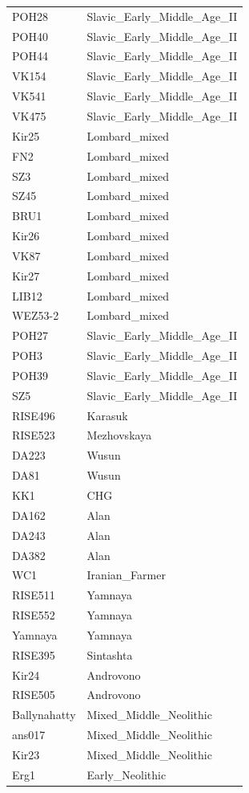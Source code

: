 \begin{longtable}[t]{ll}
POH28 & Slavic\_Early\_Middle\_Age\_II\\
POH40 & Slavic\_Early\_Middle\_Age\_II\\
POH44 & Slavic\_Early\_Middle\_Age\_II\\
VK154 & Slavic\_Early\_Middle\_Age\_II\\
VK541 & Slavic\_Early\_Middle\_Age\_II\\
VK475 & Slavic\_Early\_Middle\_Age\_II\\
Kir25 & Lombard\_mixed\\
FN2 & Lombard\_mixed\\
SZ3 & Lombard\_mixed\\
SZ45 & Lombard\_mixed\\
BRU1 & Lombard\_mixed\\
Kir26 & Lombard\_mixed\\
VK87 & Lombard\_mixed\\
Kir27 & Lombard\_mixed\\
LIB12 & Lombard\_mixed\\
WEZ53-2 & Lombard\_mixed\\
POH27 & Slavic\_Early\_Middle\_Age\_II\\
POH3 & Slavic\_Early\_Middle\_Age\_II\\
POH39 & Slavic\_Early\_Middle\_Age\_II\\
SZ5 & Slavic\_Early\_Middle\_Age\_II\\
RISE496 & Karasuk\\
RISE523 & Mezhovskaya\\
DA223 & Wusun\\
DA81 & Wusun\\
KK1 & CHG\\
DA162 & Alan\\
DA243 & Alan\\
DA382 & Alan\\
WC1 & Iranian\_Farmer\\
RISE511 & Yamnaya\\
RISE552 & Yamnaya\\
Yamnaya & Yamnaya\\
RISE395 & Sintashta\\
Kir24 & Androvono\\
RISE505 & Androvono\\
Ballynahatty & Mixed\_Middle\_Neolithic\\
ans017 & Mixed\_Middle\_Neolithic\\
Kir23 & Mixed\_Middle\_Neolithic\\
Erg1 & Early\_Neolithic\\

\end{longtable}
